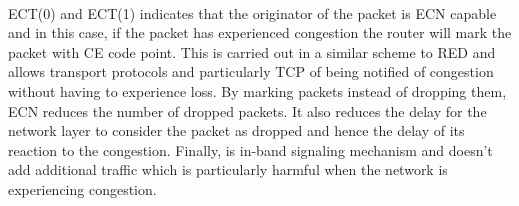 \\ECT(0) and ECT(1) indicates that the originator of the packet is ECN capable and in this case, if the packet has experienced congestion the router will mark the packet with CE code point. This is carried out in a similar scheme to RED and allows transport protocols and particularly TCP of being notified of congestion without having to experience loss. 
By marking packets instead of dropping them, ECN reduces the number of dropped packets. It also reduces the delay for the network layer to consider the packet as dropped and hence the delay of its reaction to the congestion. Finally, is in-band signaling mechanism and doesn't add additional traffic which is particularly harmful when the network is experiencing congestion.




